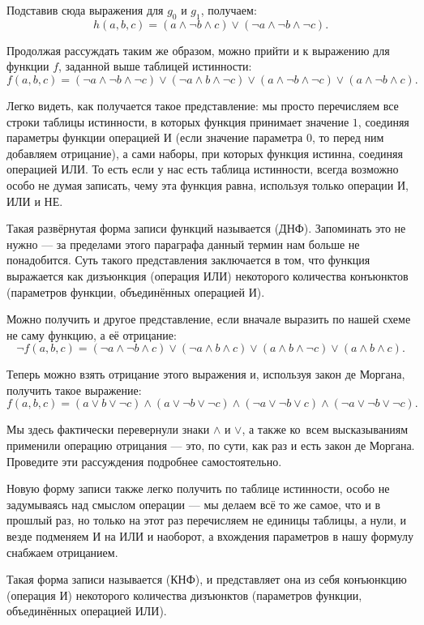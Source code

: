 Подставив сюда выражения для $g_0$ и $g_1$, получаем: $$h(a, b, c) = (a\land \neg b \land c) \lor (\neg a \land \neg b \land \neg c).$$

Продолжая рассуждать таким же образом, можно прийти и к выражению для функции $f$, заданной выше таблицей истинности: $$f(a, b, c) = (\neg a \land \neg b \land \neg c) \lor (\neg a \land b \land \neg c)\lor (a \land \neg b \land \neg c) \lor (a\land \neg b \land c). $$

Легко видеть, как получается такое представление: мы просто перечисляем все строки таблицы истинности, в которых функция принимает значение $1$, соединяя параметры функции операцией И (если значение параметра $0$, то перед ним добавляем отрицание), а сами наборы, при которых функция истинна, соединяя операцией ИЛИ. То есть если у нас есть таблица истинности, всегда возможно особо не думая записать, чему эта функция равна, используя только операции И, ИЛИ и НЕ.

Такая развёрнутая форма записи функций называется  (ДНФ). Запоминать это не нужно — за пределами этого параграфа данный термин нам больше не понадобится. Суть такого представления заключается в том, что функция выражается как дизъюнкция (операция ИЛИ) некоторого количества конъюнктов (параметров функции, объединённых операцией И).

Можно получить и другое представление, если вначале выразить по нашей схеме не саму функцию, а её отрицание:
$$\neg f(a, b, c) = (\neg a \land \neg b \land c) \lor (\neg a \land b \land c) \lor (a\land b\land \neg c) \lor (a\land b \land c).$$

Теперь можно взять отрицание этого выражения и, используя закон де Моргана, получить такое выражение:
$$f(a, b, c) = (a \lor b \lor \neg c)\land(a\lor \neg b\lor \neg c)\land(\neg a\lor \neg b\lor c)\land(\neg a\lor\neg b\lor \neg c).$$

Мы здесь фактически перевернули знаки $\land$ и $\lor$, а также ко~всем высказываниям применили операцию отрицания — это, по сути, как раз и есть закон де Моргана. Проведите эти рассуждения подробнее самостоятельно.

Новую форму записи также легко получить по таблице истинности, особо не задумываясь над смыслом операции — мы делаем всё то же самое, что и в прошлый раз, но только на этот раз перечисляем не единицы таблицы, а нули, и везде подменяем И на ИЛИ и наоборот, а вхождения параметров в нашу формулу снабжаем отрицанием.

Такая форма записи называется  (КНФ), и представляет она из себя конъюнкцию (операция И) некоторого количества дизъюнктов (параметров функции, объединённых операцией ИЛИ).

